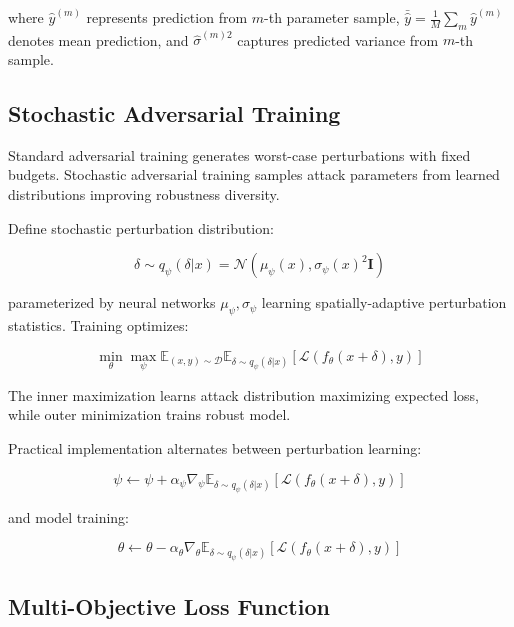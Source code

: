 where $\hat{y}^{(m)}$ represents prediction from $m$-th parameter sample, $\bar{\hat{y}} = \frac{1}{M}\sum_m \hat{y}^{(m)}$ denotes mean prediction, and $\hat{\sigma}^{(m)2}$ captures predicted variance from $m$-th sample.

\subsection{Stochastic Adversarial Training}

Standard adversarial training generates worst-case perturbations with fixed budgets. Stochastic adversarial training samples attack parameters from learned distributions improving robustness diversity.

Define stochastic perturbation distribution:

\begin{equation}
\delta \sim q_\psi(\delta | x) = \mathcal{N}(\mu_\psi(x), \sigma_\psi(x)^2 \mathbf{I})
\end{equation}

parameterized by neural networks $\mu_\psi, \sigma_\psi$ learning spatially-adaptive perturbation statistics. Training optimizes:

\begin{equation}
\min_\theta \max_\psi \mathbb{E}_{(x,y) \sim \mathcal{D}} \mathbb{E}_{\delta \sim q_\psi(\delta|x)}[\mathcal{L}(f_\theta(x + \delta), y)]
\end{equation}

The inner maximization learns attack distribution maximizing expected loss, while outer minimization trains robust model.

Practical implementation alternates between perturbation learning:

\begin{equation}
\psi \leftarrow \psi + \alpha_\psi \nabla_\psi \mathbb{E}_{\delta \sim q_\psi(\delta|x)}[\mathcal{L}(f_\theta(x+\delta), y)]
\end{equation}

and model training:

\begin{equation}
\theta \leftarrow \theta - \alpha_\theta \nabla_\theta \mathbb{E}_{\delta \sim q_\psi(\delta|x)}[\mathcal{L}(f_\theta(x+\delta), y)]
\end{equation}

\subsection{Multi-Objective Loss Function}

